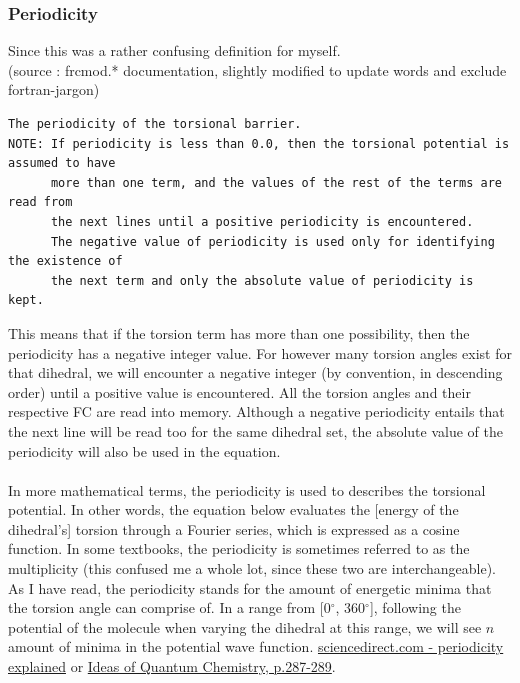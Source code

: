 \documentclass[a4paper]{article}
\begin{document}
\subsubsection{Periodicity}
Since this was a rather confusing definition for myself.\\ (source : frcmod.* documentation, slightly modified to update words and exclude fortran-jargon)
\begin{tcolorbox}
\begin{verbatim}
The periodicity of the torsional barrier.
NOTE: If periodicity is less than 0.0, then the torsional potential is assumed to have
      more than one term, and the values of the rest of the terms are read from
      the next lines until a positive periodicity is encountered.
      The negative value of periodicity is used only for identifying the existence of
      the next term and only the absolute value of periodicity is kept.
\end{verbatim}
\end{tcolorbox}
\noindent This means that if the torsion term has more than one possibility, then the periodicity has a negative integer value. For however many torsion angles exist for that dihedral, we will encounter a negative integer (by convention, in descending order) until a positive value is encountered. All the torsion angles and their respective FC are read into memory. Although a negative periodicity entails that the next line will be read too for the same dihedral set, the absolute value of the periodicity will also be used in the equation.\\
\\
In more mathematical terms, the periodicity is used to describes the torsional potential. In other words, the equation below evaluates the [energy of the dihedral's] torsion through a Fourier series, which is expressed as a cosine function. In some textbooks, the periodicity is sometimes referred to as the multiplicity (this confused me a whole lot, since these two are interchangeable).\\
As I have read, the periodicity stands for the amount of energetic minima that the torsion angle can comprise of. In a range from [0$^{\circ}$, 360$^{\circ}$], following the potential of the molecule when varying the dihedral at this range, we will see $n$ amount of minima in the potential wave function.
\href{https://www.sciencedirect.com/topics/chemistry/torsional-potential}{sciencedirect.com - periodicity explained} or \href{https://www.sciencedirect.com/book/9780444522276/ideas-of-quantum-chemistry}{Ideas of Quantum Chemistry, p.287-289}.
\end{document}
